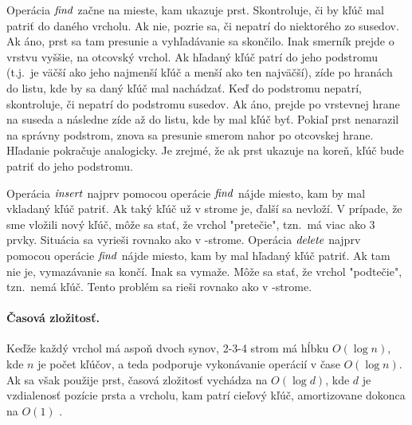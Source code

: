 Operácia $\mathop{\mathit{find}}$ začne na mieste, kam ukazuje prst. Skontroluje, či by kľúč mal patriť do daného
vrcholu. Ak nie, pozrie sa, či nepatrí do niektorého zo susedov. Ak áno, prst sa tam presunie
a vyhľadávanie sa skončilo. Inak smerník prejde o vrstvu vyššie, na otcovský vrchol. Ak hľadaný
kľúč patrí do jeho podstromu (t.j.\ je väčší ako jeho najmenší kľúč a menší ako ten najväčší),
zíde po hranách do listu, kde by sa daný kľúč mal nachádzať. Keď do podstromu nepatrí, skontroluje,
či nepatrí do podstromu susedov. Ak áno, prejde po vrstevnej hrane na suseda a následne zíde až
do listu, kde by mal kľúč byť. Pokiaľ prst nenarazil na správny podstrom, znova sa presunie smerom
nahor po otcovskej hrane. Hľadanie pokračuje analogicky. Je zrejmé, že ak prst ukazuje na koreň,
kľúč bude patriť do jeho podstromu.


Operácia $\mathop{\mathit{insert}}$ najprv pomocou operácie $\mathop{\mathit{find}}$ nájde miesto, kam by mal vkladaný kľúč patriť.
Ak taký kľúč už v strome je, ďalší sa nevloží. V prípade, že sme vložili nový kľúč, môže sa stať,
že vrchol "pretečie", tzn.\ má viac ako 3 prvky. Situácia sa vyrieši rovnako ako v \Bp-strome.
Operácia $\mathop{\mathit{delete}}$ najprv pomocou operácie $\mathop{\mathit{find}}$ nájde miesto, kam by mal hľadaný kľúč patriť.
Ak tam nie je, vymazávanie sa končí. Inak sa vymaže. Môže sa stať, že vrchol "podtečie", tzn.\ 
nemá kľúč. Tento problém sa rieši rovnako ako v \Bp-strome.

\paragraph{Časová zložitosť.}
Keďže každý vrchol má aspoň dvoch synov, 2-3-4 strom má hĺbku $O(\log n)$, kde $n$ je počet kľúčov,
a teda podporuje vykonávanie operácií v čase $O(\log n)$. Ak sa však použije prst, časová zložitosť
vychádza na $O(\log d)$, kde $d$ je vzdialenosť pozície prsta a vrcholu, kam patrí cieľový kľúč,
amortizovane dokonca na $O(1)$ \citet{sahni}.

